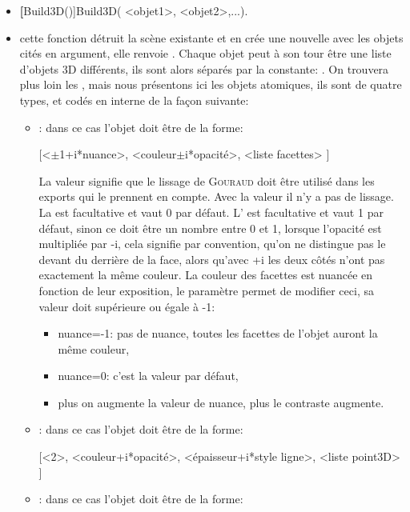 \begin{itemize}
 \item \util \textbf[Build3D()]{Build3D( <objet1>, <objet2>,...)}.
 \item \desc cette fonction détruit la scène existante et en crée une nouvelle avec les objets cités en argument, elle renvoie \Nil. Chaque objet peut à son tour être une liste d'objets 3D différents, ils sont alors séparés par la constante: . On trouvera plus loin les , mais nous présentons ici les objets \og atomiques\fg, ils sont de quatre types, et codés en interne de la façon suivante: 

  \begin{itemize}
  \item {}: dans ce cas l'objet doit être de la forme: 

\centerline{[<$\pm$1+i*nuance>, <couleur$\pm$i*opacité>, <liste facettes> ]}

 La valeur  signifie que le lissage de \textsc{Gouraud} doit être utilisé dans les exports qui le prennent en compte. Avec la valeur  il n'y a pas de lissage. La  est facultative et vaut 0 par défaut. L' est facultative et vaut 1 par défaut, sinon ce doit être un nombre entre 0 et 1, lorsque l'opacité est multipliée par -i, cela signifie par convention, qu'on ne distingue pas le devant du derrière de la face, alors qu'avec +i les deux côtés n'ont pas exactement la même couleur. La couleur des facettes est nuancée en fonction de leur exposition, le paramètre  permet de modifier ceci, sa valeur doit supérieure ou égale à -1:
    \begin{itemize}
    \item nuance=-1: pas de nuance, toutes les facettes de l'objet auront la même couleur,
    \item nuance=0: c'est la valeur par défaut,
    \item plus on augmente la valeur de nuance, plus le contraste augmente.
    \end{itemize}
  \item {}: dans ce cas l'objet doit être de la forme:

\centerline{[<2>, <couleur+i*opacité>, <épaisseur+i*style ligne>, <liste point3D> ]}

  \item {}: dans ce cas l'objet doit être de la forme: 


\end{itemize}
\end{itemize}
